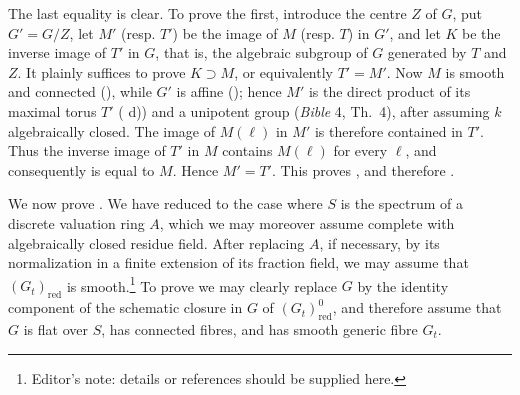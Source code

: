 The last equality is clear. To prove the first, introduce the centre \(Z\) of
\(G\), put \(G'=G/Z\), let \(M'\) (resp. \(T'\)) be the image of \(M\) (resp.
\(T\)) in \(G'\), and let \(K\) be the inverse image of \(T'\) in \(G\), that is,
the algebraic subgroup of \(G\) generated by \(T\) and \(Z\). It plainly suffices
to prove \(K\supset M\), or equivalently \(T'=M'\). Now \(M\) is smooth and
connected (), while \(G'\) is affine (); hence \(M'\) is the
direct product of its maximal torus \(T'\) ( d)) and a unipotent
group (\emph{Bible} 4, Th.~4), after assuming \(k\) algebraically closed. The image
of \(M(\ell)\) in \(M'\) is therefore contained in \(T'\). Thus the inverse image
of \(T'\) in \(M\) contains \(M(\ell)\) for every \(\ell\), and consequently is
equal to \(M\). Hence \(M'=T'\). This proves , and therefore .

We now prove . We have reduced to the case where \(S\) is the spectrum of a
discrete valuation ring \(A\), which we may moreover assume complete with
algebraically closed residue field. After replacing \(A\), if necessary, by its
normalization in a finite extension of its fraction field, we may assume that
\((G_t)_{\mathrm{red}}\) is smooth.\footnote{Editor's note: details or references
should be supplied here.} To prove  we may clearly replace \(G\) by the identity
component of the schematic closure in \(G\) of \((G_t)^0_{\mathrm{red}}\), and
therefore assume that \(G\) is flat over \(S\), has connected fibres, and has smooth
generic fibre \(G_t\).

